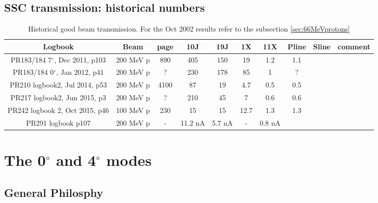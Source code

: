 \documentclass[11pt]{report}
\begin{document}
\section{SSC transmission: historical numbers}

\begin{landscape}
\begin{table}[!ht]
\centering
\begin{tabular}{|c|c|c|c|c|c|c|c|c|c|}
\hline
Logbook & Beam & page & 10J & 19J & 1X & 11X & Pline & Sline & comment\\ 
\hline
\hline
PR183/184 7$^{\circ}$, Dec 2011, p103 & 200 MeV p & 890  & 405 & 150 & 19 & 1.2 & 1.1 & \\
PR183/184 0$^{\circ}$, Jan 2012, p41  & 200 MeV p &   ?  & 230 & 178 & 85 & 1 & ? & \\
PR210 logbook2, Jul 2014, p53         & 200 MeV p & 4100 & 87 & 19 & 4.7 & 0.5 & 0.5 & \\
PR217 logbook2, Jun 2015, p3          & 200 MeV p & ?    & 210 & 45 & 7 & 0.6 & 0.6 & \\
PR242 logbook 2, Oct 2015, p46        & 100 MeV p &  230 & 15 & 15 & 12.7 & 1.3 & 1.3 & \\
PR291 logbook p107                    & 200 MeV p & -    & 11.2 nA & 5.7 nA & - & 0.8 nA &  \\
\hline
\end{tabular}
\caption{Historical good beam transmission. For the Oct 2002 results refer 
to the subsection \ref{sec:66MeVprotons}}
\label{table:goodresolution}
\end{table}

\end{landscape}






\clearpage



\chapter{The 0$^{\circ}$ and 4$^{\circ}$ modes}\label{chap:The0degreeMode}



\section{General Philosphy}
\end{document}
